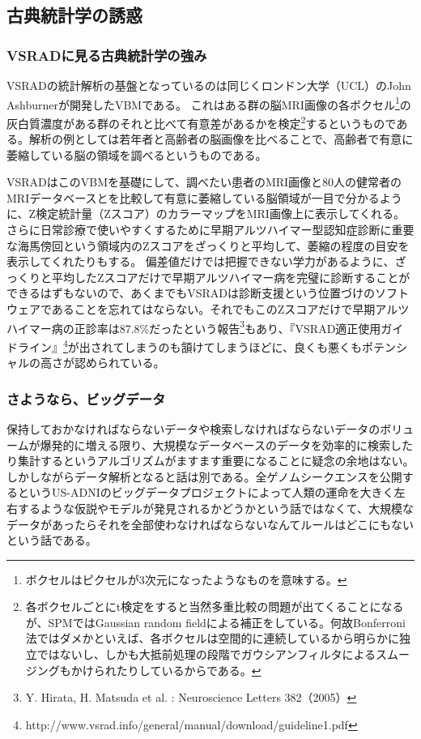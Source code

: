 \subsection{古典統計学の誘惑}
\subsubsection{VSRADに見る古典統計学の強み}
VSRADの統計解析の基盤となっているのは同じくロンドン大学（UCL）のJohn Ashburnerが開発したVBMである。
これはある群の脳MRI画像の各ボクセル\footnote{ボクセルはピクセルが3次元になったようなものを意味する。}の灰白質濃度がある群のそれと比べて有意差があるかを検定\footnote{各ボクセルごとにt検定をすると当然多重比較の問題が出てくることになるが、SPMではGaussian random fieldによる補正をしている。何故Bonferroni法ではダメかといえば、各ボクセルは空間的に連続しているから明らかに独立ではないし、しかも大抵前処理の段階でガウシアンフィルタによるスムージングもかけられたりしているからである。}するというものである。解析の例としては若年者と高齢者の脳画像を比べることで、高齢者で有意に萎縮している脳の領域を調べるというものである。

VSRADはこのVBMを基礎にして、調べたい患者のMRI画像と80人の健常者のMRIデータベースとを比較して有意に萎縮している脳領域が一目で分かるように、Z検定統計量（Zスコア）のカラーマップをMRI画像上に表示してくれる。
さらに日常診療で使いやすくするために早期アルツハイマー型認知症診断に重要な海馬傍回という領域内のZスコアをざっくりと平均して、萎縮の程度の目安を表示してくれたりもする。
偏差値だけでは把握できない学力があるように、ざっくりと平均したZスコアだけで早期アルツハイマー病を完璧に診断することができるはずもないので、あくまでもVSRADは診断支援という位置づけのソフトウェアであることを忘れてはならない。それでもこのZスコアだけで早期アルツハイマー病の正診率は87.8\%だったという報告\footnote{Y. Hirata, H. Matsuda et al. : Neuroscience Letters 382（2005）}もあり、『VSRAD適正使用ガイドライン』\footnote{http://www.vsrad.info/general/manual/download/guideline1.pdf}が出されてしまうのも頷けてしまうほどに、良くも悪くもポテンシャルの高さが認められている。

\subsubsection{さようなら、ビッグデータ}
保持しておかなければならないデータや検索しなければならないデータのボリュームが爆発的に増える限り、大規模なデータベースのデータを効率的に検索したり集計するというアルゴリズムがますます重要になることに疑念の余地はない。
しかしながらデータ解析となると話は別である。全ゲノムシークエンスを公開するというUS-ADNIのビッグデータプロジェクトによって人類の運命を大きく左右するような仮説やモデルが発見されるかどうかという話ではなくて、大規模なデータがあったらそれを全部使わなければならないなんてルールはどこにもないという話である。

